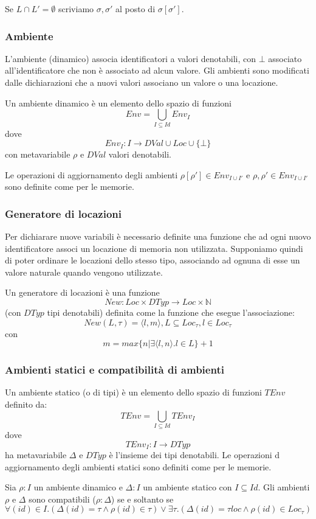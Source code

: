 \documentclass{article}[10pt]
\begin{document}
	Se $L\cap L'=\emptyset$ scriviamo $\sigma, \sigma'$ al posto di $\sigma [\sigma']$.
	
	\subsubsection{Ambiente}
	L'ambiente (dinamico) associa identificatori a valori denotabili, con $\bot$ associato all'identificatore che non è associato ad alcun valore. Gli ambienti sono modificati dalle dichiarazioni che a nuovi valori associano un valore o una locazione.
	
	Un ambiente dinamico è un elemento dello spazio di funzioni $$Env=\bigcup\limits_{I\subseteq Id} Env_I$$ dove $$Env_I:I \to DVal \cup Loc\cup \{\bot\}$$ con metavariabile $\rho$ e $DVal$ valori denotabili.
	
	Le operazioni di aggiornamento degli ambienti $\rho[\rho'] \in Env_{I \cup I'}$ e $\rho,\rho' \in Env_{I \cup I'}$ sono definite come per le memorie.
	
	\subsubsection{Generatore di locazioni}
	Per dichiarare nuove variabili è necessario definite una funzione che ad ogni nuovo identificatore associ un locazione di memoria non utilizzata. Supponiamo quindi di poter ordinare le locazioni dello stesso tipo, associando ad ognuna di esse un valore naturale quando vengono utilizzate.
	
	Un generatore di locazioni è una funzione $$New:Loc \times DTyp \to Loc \times \mathbb{N} $$ (con $DTyp$ tipi denotabili) definita come la funzione che esegue l'associazione:
	$$New(L, \tau) = \langle l,m \rangle, L \subseteq Loc_\tau, l\in Loc_\tau$$ con $$m=max\{n | \exists \langle l,n \rangle.l\in L\}+1$$
	
	\subsubsection{Ambienti statici e compatibilità di ambienti}
	Un ambiente statico (o di tipi) è un elemento dello spazio di funzioni $TEnv$ definito da: $$TEnv= \bigcup\limits_{I \subseteq Id} TEnv_I$$ dove $$TEnv_I:I \to DTyp$$ ha metavariabile $\Delta$ e $DTyp$ è l'insieme dei tipi denotabili. Le operazioni d aggiornamento degli ambienti statici sono definiti come per le memorie.
	
	Sia $\rho : I$ un ambiente dinamico e $\Delta:I$ un ambiente statico con $I\subseteq Id$. Gli ambienti $\rho$ e $\Delta$ sono compatibili ($\rho : \Delta$) se e soltanto se $$\forall(id) \in I.(\Delta(id)=\tau \wedge \rho(id) \in \tau) \vee \exists \tau.(\Delta(id) = \tau loc \wedge \rho(id) \in Loc_\tau)$$
	
\end{document}

